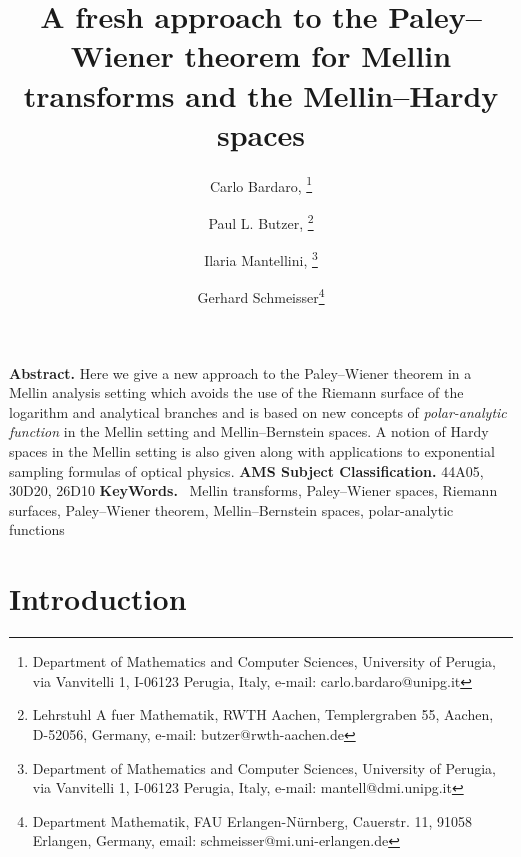 \documentclass[amsmath,english,a4paper,graphicx,12pt]{article}
\title{\bf A fresh approach to the Paley--Wiener theorem for Mellin transforms and the Mellin--Hardy spaces}
\author{Carlo Bardaro, \thanks{
Department of Mathematics and Computer Sciences, University of Perugia,
via Vanvitelli 1, I-06123 Perugia, Italy, e-mail: 
carlo.bardaro@unipg.it} \and
Paul L. Butzer, \thanks{Lehrstuhl A fuer Mathematik, RWTH Aachen, Templergraben 55, Aachen, D-52056, Germany, e-mail: butzer@rwth-aachen.de}\and
Ilaria Mantellini, \thanks{Department of Mathematics and Computer Sciences, University of Perugia,
via Vanvitelli 1, I-06123 Perugia, Italy, e-mail: 
mantell@dmi.unipg.it}\and Gerhard Schmeisser\thanks{Department Mathematik, FAU Erlangen-N\"{u}rnberg, Cauerstr. 11, 91058 Erlangen, Germany, 
email: schmeisser@mi.uni-erlangen.de}
}
\begin{document}
\maketitle
\noindent
{\bf Abstract.} Here we give a new approach to the Paley--Wiener theorem in a Mellin analysis setting which avoids the use of the Riemann surface of the logarithm
 and analytical branches and is based on  new concepts of {\it polar-analytic function} in the Mellin setting and Mellin--Bernstein spaces. A notion of Hardy spaces in the Mellin setting is also given along with applications to exponential sampling  formulas of optical physics.
\vskip0.3cm
\noindent
{\bf AMS Subject Classification.} 44A05, 30D20, 26D10
\vskip0.3cm
\noindent
{\bf KeyWords.}~ Mellin transforms, Paley--Wiener spaces, Riemann surfaces, Paley--Wiener theorem, Mellin--Bernstein spaces, polar-analytic functions


\section{\bf Introduction}
\end{document}
